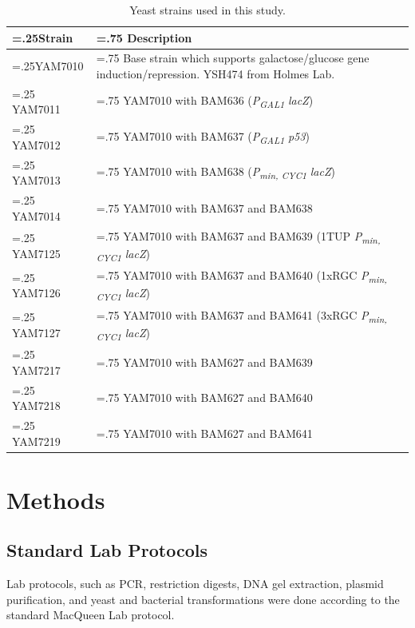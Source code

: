 \begin{table}[H]
\centering
\renewcommand{\arraystretch}{1.2}
{
\begin{tabularx}{\textwidth}{|>{\hsize=.25\hsize}X|>{\hsize=.75\hsize}X|}
\hline
Strain & Description \\
\hline
YAM7010 & Base strain which supports galactose/glucose gene induction/repression. YSH474 from Holmes Lab. \\
\hline
YAM7011 & YAM7010 with BAM636 (\textit{P\textsubscript{GAL1}} \textminus{} \textit{lacZ}) \\
\hline
YAM7012 & YAM7010 with BAM637 (\textit{P\textsubscript{GAL1}} \textminus{} \textit{p53}) \\
\hline
YAM7013 & YAM7010 with BAM638 (\textit{P\textsubscript{min, CYC1}} \textminus{} \textit{lacZ})\\
\hline
YAM7014 & YAM7010 with BAM637 and BAM638 \\
\hline
YAM7125 & YAM7010 with BAM637 and BAM639 (1TUP \textminus{} \textit{P\textsubscript{min, CYC1}} \textminus{} \textit{lacZ}) \\
\hline
YAM7126 & YAM7010 with BAM637 and BAM640 (1xRGC \textminus{} \textit{P\textsubscript{min, CYC1}} \textminus{} \textit{lacZ})\\
\hline
YAM7127 & YAM7010 with BAM637 and BAM641 (3xRGC \textminus{} \textit{P\textsubscript{min, CYC1}} \textminus{} \textit{lacZ}) \\
\hline
YAM7217 & YAM7010 with BAM627 and BAM639 \\
\hline
YAM7218 & YAM7010 with BAM627 and BAM640 \\
\hline
YAM7219 & YAM7010 with BAM627 and BAM641 \\
\hline
\end{tabularx}
}
\caption[Yeast Strain Table]{Yeast strains used in this study.}
\label{tab:yeast-strains}
\end{table}

\FloatBarrier

\section{Methods}

\subsection{Standard Lab Protocols}

Lab protocols, such as PCR, restriction digests, DNA gel extraction, plasmid purification, and yeast and bacterial transformations were done according to the standard MacQueen Lab protocol.

